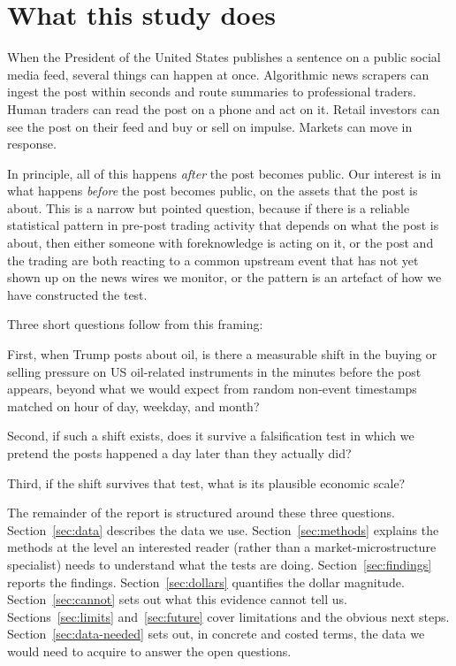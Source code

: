 \documentclass[11pt,a4paper]{article}
\begin{document}
\section{What this study does}\label{sec:intro}

When the President of the United States publishes a sentence on a public social media feed, several things can happen at once. Algorithmic news scrapers can ingest the post within seconds and route summaries to professional traders. Human traders can read the post on a phone and act on it. Retail investors can see the post on their feed and buy or sell on impulse. Markets can move in response.

In principle, all of this happens \emph{after} the post becomes public. Our interest is in what happens \emph{before} the post becomes public, on the assets that the post is about. This is a narrow but pointed question, because if there is a reliable statistical pattern in pre-post trading activity that depends on what the post is about, then either someone with foreknowledge is acting on it, or the post and the trading are both reacting to a common upstream event that has not yet shown up on the news wires we monitor, or the pattern is an artefact of how we have constructed the test.

Three short questions follow from this framing:

First, when Trump posts about oil, is there a measurable shift in the buying or selling pressure on US oil-related instruments in the minutes before the post appears, beyond what we would expect from random non-event timestamps matched on hour of day, weekday, and month?

Second, if such a shift exists, does it survive a falsification test in which we pretend the posts happened a day later than they actually did?

Third, if the shift survives that test, what is its plausible economic scale?

The remainder of the report is structured around these three questions. Section~\ref{sec:data} describes the data we use. Section~\ref{sec:methods} explains the methods at the level an interested reader (rather than a market-microstructure specialist) needs to understand what the tests are doing. Section~\ref{sec:findings} reports the findings. Section~\ref{sec:dollars} quantifies the dollar magnitude. Section~\ref{sec:cannot} sets out what this evidence cannot tell us. Sections~\ref{sec:limits} and~\ref{sec:future} cover limitations and the obvious next steps. Section~\ref{sec:data-needed} sets out, in concrete and costed terms, the data we would need to acquire to answer the open questions.
\end{document}
